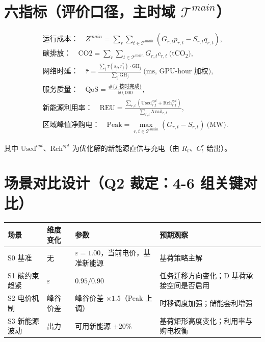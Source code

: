 \documentclass{internal-report}
\begin{document}
\section{六指标（评价口径，主时域 $\mathcal{T}^{main}$）}

\begin{align}
  &\text{运行成本：}\quad Z^{main} = \sum_{r}\sum_{t\in\mathcal{T}^{main}} (G_{r,t}p_{r,t} - S_{r,t}q_{r,t}), \label{eq:m1}\\
  &\text{碳排放：}\quad \mathrm{CO2} = \sum_{r}\sum_{t\in\mathcal{T}^{main}} G_{r,t}c_{r,t}\ \text{(tCO$_2$)}, \label{eq:m2}\\
  &\text{网络时延：}\quad \bar\tau = \frac{\sum_j \tau(s_j, r_j^*) \cdot \text{GH}_j}{\sum_j \text{GH}_j}\ \text{(ms, GPU-hour 加权)}, \label{eq:m3}\\
  &\text{服务质量：}\quad \text{QoS} = \frac{\#\{j: \text{按时完成}\}}{50{,}000}, \label{eq:m4}\\
  &\text{新能源利用率：}\quad
    \text{REU} = \frac{\sum_{r,t} (\text{Used}^{opt}_{r,t} + \text{Rch}^{opt}_{r,t})}{\sum_{r,t} \text{Avail}_{r,t}}, \label{eq:m5}\\
  &\text{区域峰值净购电：}\quad \mathrm{Peak} = \max_{r,t\in\mathcal{T}^{main}} (G_{r,t} - S_{r,t})\ \text{(MW)}. \label{eq:m6}
\end{align}

其中 $\text{Used}^{opt}$、$\text{Rch}^{opt}$ 为优化解的新能源直供与充电（由 $R_t$、$C^r_t$ 给出）。

\section{场景对比设计（Q2 裁定：4-6 组关键对比）}

\begin{center}
\footnotesize
\begin{tabular}{llll}
\toprule
场景 & 维度变化 & 参数 & 预期观察 \\
\midrule
S0 基准 & 无 & $\varepsilon=1.00$，当前电价，基准新能源 & 基荷策略主解 \\
S1 碳约束趋紧 & $\varepsilon$ & $0.95 / 0.90$ & 任务迁移方向变化；D 基荷承接空间是否启用 \\
S2 电价机制 & 峰谷价差 & 峰谷价差 $\times 1.5$（Peak 上调） & 时移调度加强；储能套利增强 \\
S3 新能源波动 & 出力 & 可用新能源 $\pm 20\%$ & 基荷矩形高度变化；利用率与购电权衡 \\
\bottomrule
\end{tabular}
\end{center}
\end{document}
